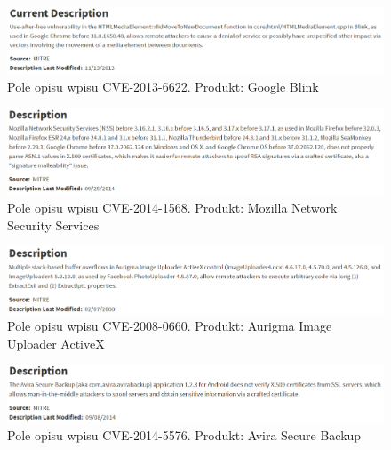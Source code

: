 \documentclass[a4paper,12pt,twoside]{article}
\begin{document}
\begin{figure}
    \centering
    \includegraphics[width=1.0\textwidth]{image/010CVE20136622.png}
    \caption{Pole opisu wpisu CVE-2013-6622. Produkt: Google Blink}
    \label{fig:Rysunek 10}
\end{figure}

\begin{figure}
    \centering
    \includegraphics[width=1.0\textwidth]{image/011CVE20141568.png}
    \caption{Pole opisu wpisu CVE-2014-1568. Produkt: Mozilla Network Security Services}
    \label{fig:Rysunek 11}
\end{figure}

\begin{figure}
    \centering
    \includegraphics[width=1.0\textwidth]{image/012CVE20080660.png}
    \caption{Pole opisu wpisu CVE-2008-0660. Produkt: Aurigma Image Uploader ActiveX}
    \label{fig:Rysunek 12} 
\end{figure}

\begin{figure}
    \centering
    \includegraphics[width=1.0\textwidth]{image/013CVE20145576.png}
    \caption{Pole opisu wpisu CVE-2014-5576. Produkt: Avira Secure Backup}
    \label{fig:Rysunek 13}
\end{figure}
\end{document}
